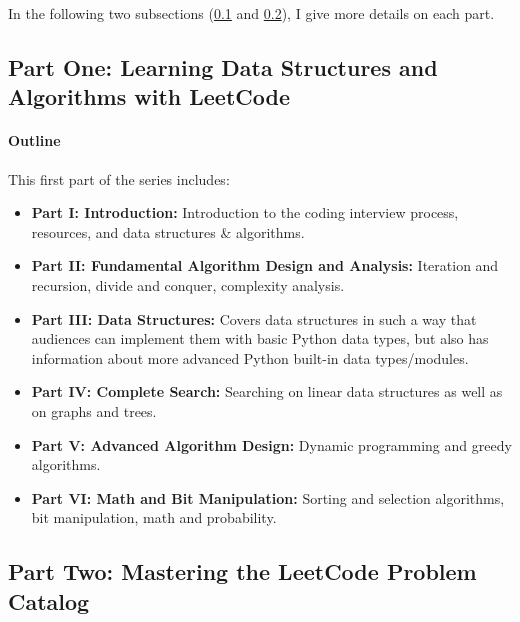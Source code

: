 \documentclass[12pt]{article}
\begin{document}
In the following two subsections (\ref{subsec_learning} and \ref{subsec_cracking}), I give more details on each part.  
\subsection{Part One: Learning Data Structures and Algorithms with LeetCode }
\label{subsec_learning}
\paragraph{Outline} This first part of the series includes:
\begin{itemize}
    \item \textbf{Part \RN{1}: Introduction:} Introduction to the coding interview process, resources, and data structures \& algorithms.
    \item \textbf{Part \RN{2}: Fundamental Algorithm Design and Analysis:} Iteration and recursion, divide and conquer, complexity analysis.
    \item \textbf{Part \RN{3}: Data Structures:} Covers data structures in such a way that audiences can implement them with basic Python data types, but also has information about more advanced Python built-in data types/modules.
    \item \textbf{Part \RN{4}: Complete Search:} Searching on linear data structures as well as on graphs and trees.
    \item \textbf{Part \RN{5}: Advanced Algorithm Design:} Dynamic programming and greedy algorithms.
    \item \textbf{Part \RN{6}: Math and Bit Manipulation:} Sorting and selection algorithms, bit manipulation, math and probability.
\end{itemize}
\subsection{Part Two: Mastering the LeetCode Problem Catalog}
\label{subsec_cracking}
\end{document}
